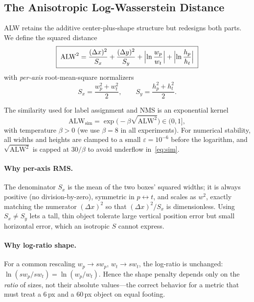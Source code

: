 \documentclass[journal]{IEEEtran}
\newcommand{\alw}{\text{ALW}}
\newcommand{\alwsq}{\text{ALW}^2}
\newcommand{\Sx}{S_x}
\newcommand{\Sy}{S_y}
\begin{document}
\subsection{The Anisotropic Log-Wasserstein Distance}

ALW retains the additive center-plus-shape structure but redesigns both parts.
We define the squared distance
\begin{equation}
\boxed{\;
\alwsq = \frac{(\Delta x)^2}{\Sx} + \frac{(\Delta y)^2}{\Sy}
       + \Bigl\lvert\ln\frac{w_p}{w_t}\Bigr\rvert
       + \Bigl\lvert\ln\frac{h_p}{h_t}\Bigr\rvert
\;}
\label{eq:alw}
\end{equation}
with \emph{per-axis} root-mean-square normalizers
\begin{equation}
\Sx = \frac{w_p^2 + w_t^2}{2}, \qquad
\Sy = \frac{h_p^2 + h_t^2}{2}.
\label{eq:Sxy}
\end{equation}

The similarity used for label assignment and NMS is an exponential kernel
\begin{equation}
\alw_{\text{sim}} = \exp\!\big(-\beta\sqrt{\alwsq}\big) \in (0,1],
\label{eq:sim}
\end{equation}
with temperature $\beta>0$ (we use $\beta=8$ in all experiments). For
numerical stability, all widths and heights are clamped to a small
$\varepsilon=10^{-6}$ before the logarithm, and $\sqrt{\alwsq}$ is capped at
$30/\beta$ to avoid underflow in~\eqref{eq:sim}.

\paragraph{Why per-axis RMS.} The denominator $\Sx$ is the mean of the two
boxes' squared widths; it is always positive (no division-by-zero), symmetric
in $p\leftrightarrow t$, and scales as $w^2$, exactly matching the numerator
$(\Delta x)^2$ so that $(\Delta x)^2/\Sx$ is dimensionless. Using
$\Sx\neq\Sy$ lets a tall, thin object tolerate large vertical position error
but small horizontal error, which an isotropic $S$ cannot express.

\paragraph{Why log-ratio shape.} For a common rescaling $w_p\!\to\!sw_p$,
$w_t\!\to\!sw_t$, the log-ratio is unchanged:
$\ln(sw_p/sw_t)=\ln(w_p/w_t)$. Hence the shape penalty depends only on the
\emph{ratio} of sizes, not their absolute values---the correct behavior for a
metric that must treat a $6$\,px and a $60$\,px object on equal footing.
\end{document}
